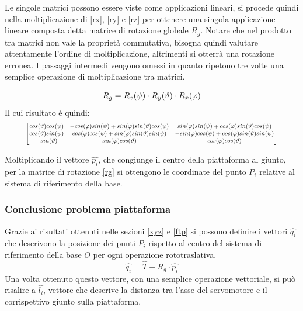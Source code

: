 \documentclass[12pt,twoside,openright]{article}
\begin{document}
Le singole matrici possono essere viste come applicazioni lineari, si procede quindi nella moltiplicazione di \eqref{rx}, \eqref{ry} e \eqref{rz} per ottenere una singola applicazione lineare composta detta matrice di rotazione globale $R_g$. Notare che nel prodotto tra matrici non vale la proprietà commutativa, bisogna quindi valutare attentamente l'ordine di moltiplicazione, altrimenti si otterrà una rotazione erronea. I passaggi intermedi vengono omessi in quanto ripetono tre volte una semplice operazione di moltiplicazione tra matrici.

\begin{equation}\label{rg}
    R_g = R_z(\psi)\cdot R_y(\vartheta)\cdot R_x(\varphi)\\
\end{equation}
Il cui risultato è quindi:
\begin{equation}\label{rg}
\resizebox{0.9\hsize}{!}{$
\begin{bmatrix}
			cos(\vartheta)cos(\psi) & -cos(\varphi)sin(\psi)+sin(\varphi)sin(\vartheta)cos(\psi) & sin(\varphi)sin(\psi)+cos(\varphi)sin(\vartheta)cos(\psi)\\
			cos(\vartheta)sin(\psi) & cos(\varphi)cos(\psi)+sin(\varphi)sin(\vartheta)sin(\psi) & -sin(\varphi)cos(\psi)+cos(\varphi)sin(\vartheta)sin(\psi)\\
			-sin(\vartheta) & sin(\varphi)cos(\vartheta) & cos(\varphi)cos(\vartheta)
			\end{bmatrix}$}
\end{equation}

Moltiplicando il vettore $\hat{p_i}$, che congiunge il centro della piattaforma al giunto, per la matrice di rotazione \eqref{rg} si ottengono le coordinate del punto $P_i$ relative al sistema di riferimento della base. 

\subsubsection{Conclusione problema piattaforma}
Grazie ai risultati ottenuti nelle sezioni \ref{xyz} e \ref{ftp} si possono definire i vettori $\hat{q_i}$ che descrivono la posizione dei punti $P_i$ rispetto al centro del sistema di riferimento della base $O$ per ogni operazione rototraslativa.
\begin{equation}\label{qi}
\hat{q_i}=\hat{T}+R_g\cdot \hat{p_i}
\end{equation}
Una volta ottenuto questo vettore, con una semplice operazione vettoriale, si può risalire a $\hat{l_i}$, vettore che descrive la distanza tra l'asse del servomotore e il corrispettivo giunto sulla piattaforma.
\end{document}

